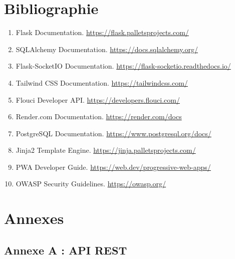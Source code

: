 \documentclass[12pt,a4paper]{report}
\begin{document}
\cleardoublepage

\chapter*{Bibliographie}

\begin{enumerate}
    \item Flask Documentation. \url{https://flask.palletsprojects.com/}
    \item SQLAlchemy Documentation. \url{https://docs.sqlalchemy.org/}
    \item Flask-SocketIO Documentation. \url{https://flask-socketio.readthedocs.io/}
    \item Tailwind CSS Documentation. \url{https://tailwindcss.com/}
    \item Flouci Developer API. \url{https://developers.flouci.com/}
    \item Render.com Documentation. \url{https://render.com/docs}
    \item PostgreSQL Documentation. \url{https://www.postgresql.org/docs/}
    \item Jinja2 Template Engine. \url{https://jinja.palletsprojects.com/}
    \item PWA Developer Guide. \url{https://web.dev/progressive-web-apps/}
    \item OWASP Security Guidelines. \url{https://owasp.org/}
\end{enumerate}

\cleardoublepage

\appendix
\chapter*{Annexes}

\section{Annexe A : API REST}
\end{document}
